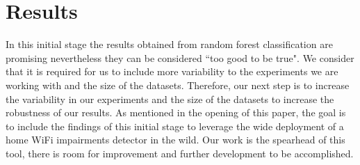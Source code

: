 \section{Results}\label{Results}



In this initial stage the results obtained from random forest classification are promising nevertheless they can be considered ``too good to be true". We consider that it is required for us to include more variability to the experiments we are working with and the size of the datasets. Therefore, our next step is to increase the variability in our experiments and the size of the datasets to increase the robustness of our results. As mentioned in the opening of this paper, the goal is to include the findings of this initial stage to leverage the wide deployment of a home WiFi impairments detector in the wild. Our work is the spearhead of this tool, there is room for improvement and further development to be accomplished.


\newpage


